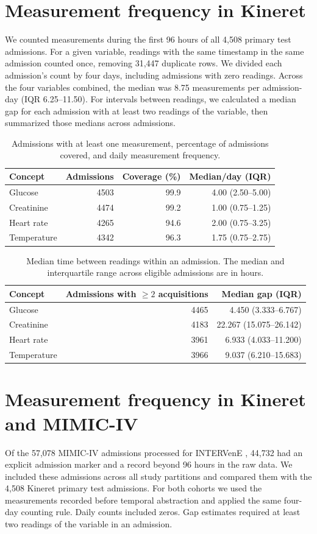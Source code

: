 ﻿\documentclass[11pt,a4paper]{article}
\begin{document}
\section{Measurement frequency in Kineret}
We counted measurements during the first 96 hours of all 4,508 primary test admissions. For a given variable, readings with the same timestamp in the same admission counted once, removing 31,447 duplicate rows. We divided each admission's count by four days, including admissions with zero readings. Across the four variables combined, the median was 8.75 measurements per admission-day (IQR 6.25--11.50). For intervals between readings, we calculated a median gap for each admission with at least two readings of the variable, then summarized those medians across admissions.
\begin{table}[htbp]\centering\small
\caption{Admissions with at least one measurement, percentage of admissions covered, and daily measurement frequency.}
\begin{tabular}{lrrr}\toprule
Concept & Admissions & Coverage (\%) & Median/day (IQR) \\\midrule
Glucose & 4503 & 99.9 & 4.00 (2.50--5.00) \\
Creatinine & 4474 & 99.2 & 1.00 (0.75--1.25) \\
Heart rate & 4265 & 94.6 & 2.00 (0.75--3.25) \\
Temperature & 4342 & 96.3 & 1.75 (0.75--2.75) \\\bottomrule
\end{tabular}\end{table}
\begin{table}[htbp]\centering\small
\caption{Median time between readings within an admission. The median and interquartile range across eligible admissions are in hours.}
\begin{tabular}{lrr}\toprule
Concept & Admissions with $\geq 2$ acquisitions & Median gap (IQR) \\\midrule
Glucose & 4465 & 4.450 (3.333--6.767) \\
Creatinine & 4183 & 22.267 (15.075--26.142) \\
Heart rate & 3961 & 6.933 (4.033--11.200) \\
Temperature & 3966 & 9.037 (6.210--15.683) \\\bottomrule
\end{tabular}\end{table}
\clearpage
\section{Measurement frequency in Kineret and MIMIC-IV}
Of the 57,078 MIMIC-IV admissions processed for INTERVenE \citep{oded2026intervene}, 44,732 had an explicit admission marker and a record beyond 96 hours in the raw data. We included these admissions across all study partitions and compared them with the 4,508 Kineret primary test admissions. For both cohorts we used the measurements recorded before temporal abstraction and applied the same four-day counting rule. Daily counts included zeros. Gap estimates required at least two readings of the variable in an admission.
\end{document}
